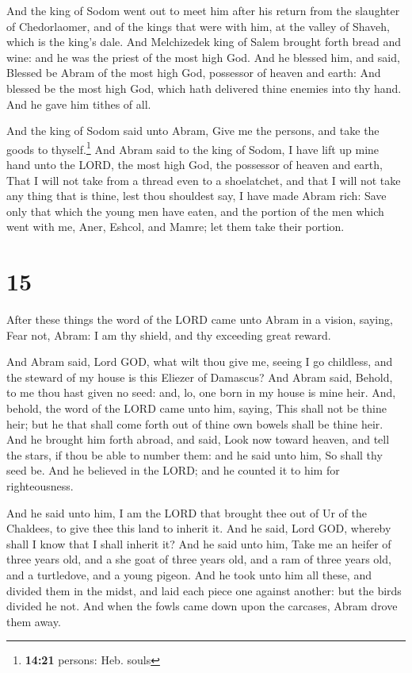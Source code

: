 And the king of Sodom went out to meet him after his
return from the slaughter of Chedorlaomer, and of the kings that were
with him, at the valley of Shaveh, which is the king's dale.
 And Melchizedek king of Salem brought forth bread and
wine: and he was the priest of the most high God.  And he
blessed him, and said, Blessed be Abram of the most high God, possessor
of heaven and earth:  And blessed be the most high God,
which hath delivered thine enemies into thy hand. And he gave him tithes
of all.

 And the king of Sodom said unto Abram, Give me the
persons, and take the goods to thyself.\footnote{\textbf{14:21} persons:
  Heb. souls}  And Abram said to the king of Sodom, I
have lift up mine hand unto the LORD, the most high God, the possessor
of heaven and earth,  That I will not take from a thread
even to a shoelatchet, and that I will not take any thing that is thine,
lest thou shouldest say, I have made Abram rich:  Save
only that which the young men have eaten, and the portion of the men
which went with me, Aner, Eshcol, and Mamre; let them take their
portion.

\hypertarget{section-14}{%
\section{15}\label{section-14}}

 After these things the word of the LORD came unto Abram
in a vision, saying, Fear not, Abram: I am thy shield, and thy exceeding
great reward.

 And Abram said, Lord GOD, what wilt thou give me, seeing
I go childless, and the steward of my house is this Eliezer of Damascus?
 And Abram said, Behold, to me thou hast given no seed:
and, lo, one born in my house is mine heir.  And, behold,
the word of the LORD came unto him, saying, This shall not be thine
heir; but he that shall come forth out of thine own bowels shall be
thine heir.  And he brought him forth abroad, and said,
Look now toward heaven, and tell the stars, if thou be able to number
them: and he said unto him, So shall thy seed be.  And he
believed in the LORD; and he counted it to him for righteousness.

 And he said unto him, I am the LORD that brought thee out
of Ur of the Chaldees, to give thee this land to inherit it.
 And he said, Lord GOD, whereby shall I know that I shall
inherit it?  And he said unto him, Take me an heifer of
three years old, and a she goat of three years old, and a ram of three
years old, and a turtledove, and a young pigeon.  And he
took unto him all these, and divided them in the midst, and laid each
piece one against another: but the birds divided he not. 
And when the fowls came down upon the carcases, Abram drove them away.

